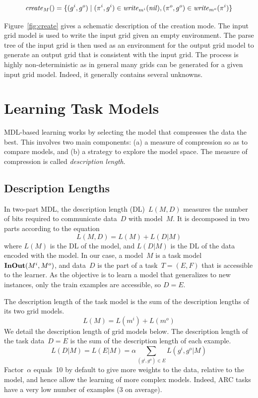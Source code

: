 \documentclass[a4paper]{llncs}
\begin{document}
\[{\it create}_M() = \{ (g^i,g^o) \mid (\pi^i,g^i) \in {\it write}_{m^i}({\it nil}), (\pi^o,g^o) \in {\it write}_{m^o}(\pi^i) \} \]

Figure~\ref{fig:create} gives a schematic description of the creation
mode. The input grid model is used to write the input grid given an
empty environment. The parse tree of the input grid is then used as an
environment for the output grid model to generate an output grid that
is consistent with the input grid. The process is highly
non-deterministic as in general many grids can be generated for a
given input grid model. Indeed, it generally contains several unknowns.


\section{Learning Task Models}
\label{learning}

MDL-based learning works by selecting the model that compresses the
data the best. This involves two main components: (a) a measure of
compression so as to compare models, and (b) a strategy to explore the
model space. The measure of compression is called {\em description
  length}.

\subsection{Description Lengths}
\label{dl}

In two-part MDL, the description length (DL)~$L(M,D)$ measures the number
of bits required to communicate data~$D$ with model~$M$. It is
decomposed in two parts according to the equation
\[ L(M,D) = L(M) + L(D|M) \] where $L(M)$ is the DL of the model, and
$L(D|M)$ is the DL of the data encoded with the model.
%
In our case, a model~$M$ is a task model~${\bf InOut}(M^i,M^o)$, and
data~$D$ is the part of a task~$T = (E,F)$ that is accessible to
the learner. As the objective is to learn a model that generalizes to
new instances, only the train examples are accessible, so
$D = E$.

The description length of the task model is the sum of the description
lengths of its two grid models.
\[ L(M) = L(m^i) + L(m^o) \]
%
We detail the description length of grid models below. The
description length of the task data~$D = E$ is the sum of the
description length of each example.
\[ L(D|M) = L(E|M) = \alpha \sum_{(g^i,g^o) \in E} L(g^i,g^o|M) \]
%
Factor~$\alpha$ equals~10 by default to give more weights to the data,
relative to the model, and hence allow the learning of more complex
models. Indeed, ARC tasks have a very low number of examples (3 on
average).
\end{document}
